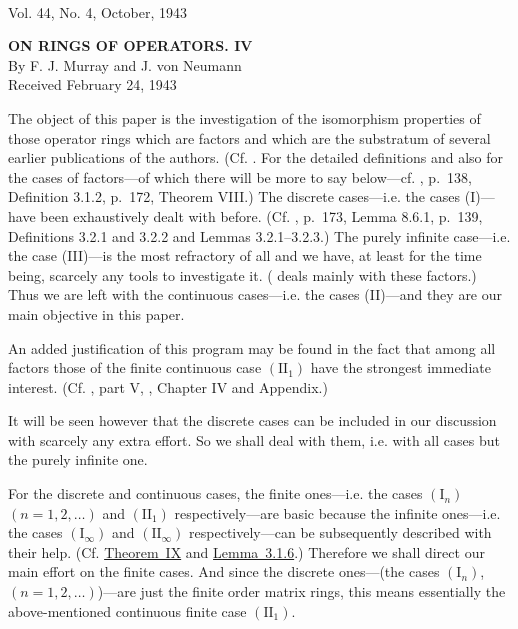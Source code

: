 \documentclass[b5paper,twoside]{article}
\newcommand{\thmref}[2]{\hyperref[#1]{\mbox{Theorem~#2}}}
\newcommand{\lemref}[2]{\hyperref[#1]{\mbox{Lemma~#2}}}
\theoremstyle{mvnplain}
\begin{document}
\setcounter{page}{1}

\thispagestyle{empty}

\\[-0.2em]
{\small Vol. 44, No. 4, October, 1943}

\vspace{1.8em}
\begin{center}
  {\Large\bfseries\MakeUppercase{On Rings of Operators. IV}}\\[1.0em]
  {\large By F. J. Murray and J. von Neumann}\\[0.8em]
  {Received February 24, 1943}
\end{center}

\vspace{0.8em}
\IntroductionHeading

The object of this paper is the investigation of the isomorphism properties of
those operator rings which are factors and which are the substratum of several
earlier publications of the authors. (Cf. \cite{ref5,ref6,ref8}. For the
detailed definitions and also for the cases of factors---of which there will be
more to say below---cf. \cite{ref5}, p.~138, Definition 3.1.2, p.~172,
Theorem VIII.) The discrete cases---i.e. the cases (I)---have been exhaustively
dealt with before. (Cf. \cite{ref5}, p.~173, Lemma 8.6.1, p.~139,
Definitions 3.2.1 and 3.2.2 and Lemmas 3.2.1--3.2.3.) The purely infinite
case---i.e. the case (III)---is the most refractory of all and we have, at least
for the time being, scarcely any tools to investigate it. (\cite{ref8} deals
mainly with these factors.) Thus we are left with the continuous cases---i.e.
the cases (II)---and they are our main objective in this paper.

An added justification of this program may be found in the fact that among all
factors those of the finite continuous case $(\mathrm{II}_1)$ have the
strongest immediate interest. (Cf. \cite{ref5}, part V, \cite{ref6}, Chapter
IV and Appendix.)

It will be seen however that the discrete cases can be included in our
discussion with scarcely any extra effort. So we shall deal with them, i.e.
with all cases but the purely infinite one.

For the discrete and continuous cases, the finite ones---i.e. the cases
$(\mathrm I_n)$ $(n=1,2,\ldots)$ and $(\mathrm{II}_1)$ respectively---are
basic because the infinite ones---i.e. the cases $(\mathrm I_\infty)$ and
$(\mathrm{II}_\infty)$ respectively---can be subsequently described with
their help. (Cf. \thmref{thm:IX}{IX} and \lemref{lem:3.1.6}{3.1.6}.)
Therefore we shall direct our main effort on the finite cases. And since the
discrete ones---(the cases $(\mathrm I_n)$, $(n=1,2,\ldots)$)---are just the
finite order matrix rings, this means essentially the above-mentioned
continuous finite case $(\mathrm{II}_1)$.
\end{document}
